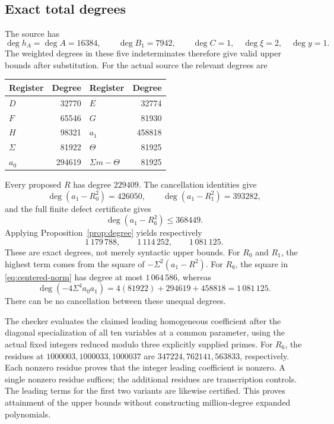\documentclass[11pt]{article}
\theoremstyle{definition}
\theoremstyle{remark}
\newcommand{\dd}{\operatorname{deg}}
\begin{document}
\subsection{Exact total degrees}

The source has
\[
 \dd h_A=\dd A=16384,\qquad \dd B_1=7942,
 \qquad \dd C=1,\quad\dd\xi=2,\quad\dd y=1.
\]
The weighted degrees in these five indeterminates therefore give valid
upper bounds after substitution. For the actual source the relevant
degrees are
\begin{center}
\begin{tabular}{@{}lrlr@{}}
\toprule
Register&Degree&Register&Degree\\
\midrule
$D$&32770&$E$&32774\\
$F$&65546&$G$&81930\\
$H$&98321&$a_1$&458818\\
$\Sigma$&81922&$\Theta$&81925\\
$a_0$&294619&$\Sigma m-\Theta$&81925\\
\bottomrule
\end{tabular}
\end{center}
Every proposed $R$ has degree $229409$. The cancellation identities give
\[
 \dd(a_1-R_0^2)=426050,\qquad
 \dd(a_1-R_1^2)=393282,
\]
and the full finite defect certificate gives
\[
 \dd(a_1-R_6^2)\leq368449.
\]
Applying Proposition~\ref{prop:degree} yields respectively
\[
 1\,179\,788,\qquad1\,114\,252,\qquad1\,081\,125.
\]
These are exact degrees, not merely syntactic upper bounds.
For $R_0$ and $R_1$, the highest term comes from the square of
$-\Sigma^2(a_1-R^2)$. For $R_6$, the square in
\eqref{eq:centered-norm} has degree at most $1\,064\,586$, whereas
\[
 \dd(-4\Sigma^4a_0a_1)
 =4(81922)+294619+458818=1\,081\,125.
\]
There can be no cancellation between these unequal degrees.

The checker evaluates the claimed leading homogeneous coefficient after
the diagonal specialization of all ten variables at a common parameter,
using the actual fixed integers reduced modulo three explicitly supplied
primes. For $R_6$, the residues at $1000003,1000033,1000037$ are
$347224,762141,563833$, respectively. Each nonzero residue proves that the
integer leading coefficient is nonzero. A single nonzero residue suffices;
the additional residues are transcription controls. The leading terms for
the first two variants are likewise certified. This proves attainment of
the upper bounds without constructing million-degree expanded polynomials.
\end{document}

